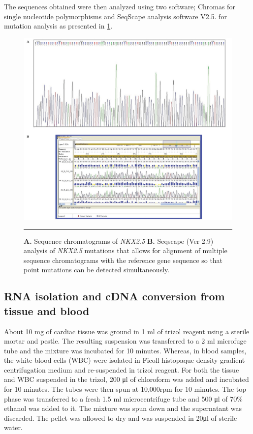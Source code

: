 \begin{refsection}
The sequences obtained were then analyzed using two software; Chromas for single nucleotide polymorphisms and SeqScape analysis software V2.5. for mutation analysis as presented in \cref{fig:2_8chromatogram}. 

\begin{figure}[!tb]
\centering
\includegraphics[width=\linewidth]{Figures/2_8chromatogram.pdf} 
\rule{35em}{0.5pt}
\caption[Seqscape analysis]{\textbf{A.} Sequence chromatograms of \textit{NKX2.5} \textbf{B.} Seqscape (Ver 2.9) analysis of \textit{NKX2.5} mutations  that allows for alignment of multiple sequence chromatograms  with the reference gene sequence so that point mutations can be detected simultaneously.}
\label{fig:2_8chromatogram}
\end{figure}

\subsection{RNA isolation and cDNA conversion from tissue and blood} 
About 10 mg of cardiac tissue was ground in 1 ml of trizol reagent using a sterile mortar and pestle. The resulting suspension was transferred to a 2 ml microfuge tube and the mixture was incubated for 10 minutes. Whereas, in blood samples, the white blood cells (WBC) were isolated in Ficoll-histopaque density gradient centrifugation medium  and  re-suspended in trizol reagent. For both the tissue and WBC suspended in the trizol, 200 μl of chloroform was added and incubated for 10 minutes. The tubes were then spun at 10,000rpm for 10 minutes. The top phase was transferred to a fresh 1.5 ml microcentrifuge tube and 500 μl of 70\% ethanol was added to it. The mixture was spun down and the supernatant was discarded. The pellet was allowed to dry and was suspended in 20μl of sterile water. 


\end{refsection}
